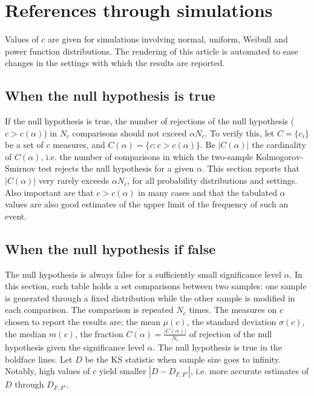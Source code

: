 \documentclass[%
	aip,
	jmp,%
	amsmath,amssymb,
	reprint,%
]{revtex4-1}
\begin{document}
\section{References through simulations}\label{sec:simulations}
Values of $c$ are given for simulations involving
normal, uniform, Weibull and power function distributions.
The rendering of this article is automated to ease changes in
the settings with which the results are reported.


\subsection{When the null hypothesis is true}
If the null hypothesis is true, the number
of rejections of the null hypothesis ($c>c(\alpha)$)
in $N_c$ comparisons should not exceed $\alpha N_c$.
To verify this, let $C=\{c_i\}$ be a set of $c$ measures,
and $C(\alpha)=\{c : c>c(\alpha)\}$.
Be $|C(\alpha)|$ the cardinality of $C(\alpha)$,
i.e. the number of comparisons in which the two-sample Kolmogorov-Smirnov
test rejects the null hypothesis for a given $\alpha$.
This section reports that
$|C(\alpha)|$ very rarely exceeds $\alpha N_c$,
for all probability distributions and settings.
Also important are that
$c>c(\alpha)$ in many cases
and that the tabulated $\alpha$ values
are also good estimates of the upper limit
of the frequency of such an event.







\FloatBarrier
\subsection{When the null hypothesis if false}
The null hypothesis is always false for a sufficiently small
significance level $\alpha$.
In this section,
each table holds a set comparisons between two samples:
one sample is generated through a
fixed distribution while the other
sample is modified in each comparison.
The comparison is repeated $N_c$ times.
The measures on $c$ chosen to report the results are:
the mean $\mu(c)$, the standard deviation $\sigma(c)$,
the median $m(c)$,
the  fraction
$\overline{C(\alpha)}=\frac{|C(\alpha)|}{N_c}$
of rejection of the null hypothesis given the significance level $\alpha$.
The null hypothesis is true in the boldface lines.
Let $D$ be the KS statistic when sample size goes to infinity.
Notably, high values of $c$ yield smaller $|D-D_{F,F'}|$,
i.e. more accurate estimates of $D$ through $D_{F,F'}$.
\end{document}
